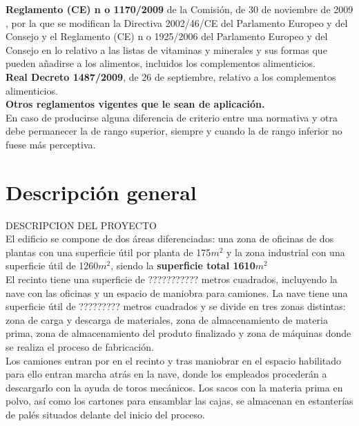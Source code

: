 {\bfseries Reglamento (CE) n o 1170/2009} de la Comisión, de 30 de noviembre de 2009 , por la que se modifican la Directiva 2002/46/CE del Parlamento Europeo y del Consejo y el Reglamento (CE) n o 1925/2006 del Parlamento Europeo y del Consejo en lo relativo a las listas de vitaminas y minerales y sus formas que pueden añadirse a los alimentos, incluidos los complementos alimenticios.\\

{\bfseries Real Decreto 1487/2009}, de 26 de septiembre, relativo a los complementos
alimenticios.\\

{\bfseries Otros reglamentos vigentes que le sean de aplicación.}\\

En caso de producirse alguna diferencia de criterio entre una normativa y otra debe permanecer la de rango superior, siempre y cuando la de rango inferior no fuese más perceptiva.

\section{Descripción general}

DESCRIPCION DEL PROYECTO\\
 
El edificio se compone de dos áreas diferenciadas: una zona de oficinas de dos plantas con una superficie útil por planta de 175$m^2$ y la zona industrial con una superficie útil de 1260$m^2$, siendo la {\bfseries superficie total 1610\mbox{\boldmath${m^2}$}}\\



El recinto tiene una superficie de ??????????? metros cuadrados, incluyendo la nave con las oficinas y un espacio de maniobra para camiones.
La nave tiene una superficie útil de ????????? metros cuadrados y se divide en tres zonas distintas: zona de carga y descarga de materiales, zona de almacenamiento de materia prima, zona de almacenamiento del produto finalizado y zona de máquinas donde se realiza el proceso de fabricación.
\\

Los camiones entran por en el recinto y tras maniobrar en el espacio habilitado para ello entran marcha atrás en la nave, donde los empleados procederán a descargarlo con la ayuda de toros mecánicos. Los sacos con la materia prima en polvo, así como los cartones para ensamblar las cajas, se almacenan en estanterías de palés situados delante del inicio del proceso. 
\\

